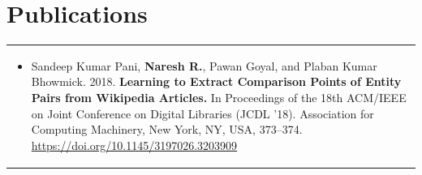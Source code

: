 \documentclass[a4paper,10pt]{extarticle} %
\begin{document}

\section{\textcolor{primary}{Publications}}
\begin{tabularx}{\linewidth}{X}
\begin{itemize}[leftmargin=*, nosep, before=\vspace{-0.8\baselineskip}, after=\vspace{-1.8\baselineskip}]
    \item Sandeep Kumar Pani, \textbf{Naresh R.}, Pawan Goyal, and Plaban Kumar Bhowmick. 2018. \textbf{Learning to Extract Comparison Points of Entity Pairs from Wikipedia Articles.} In Proceedings of the 18th ACM/IEEE on Joint Conference on Digital Libraries (JCDL '18). Association for Computing Machinery, New York, NY, USA, 373–374. {\href{https://doi.org/10.1145/3197026.3203909}{https://doi.org/10.1145/3197026.3203909}}
\end{itemize}
\end{tabularx}

\end{document}

